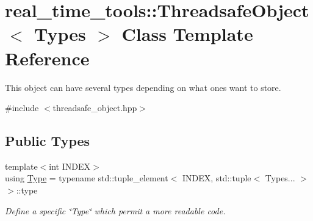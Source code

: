 \hypertarget{classreal__time__tools_1_1ThreadsafeObject}{}\section{real\+\_\+time\+\_\+tools\+:\+:Threadsafe\+Object$<$ Types $>$ Class Template Reference}
\label{classreal__time__tools_1_1ThreadsafeObject}


This object can have several types depending on what ones want to store.  




{\ttfamily \#include $<$threadsafe\+\_\+object.\+hpp$>$}

\subsection*{Public Types}
\begin{DoxyCompactItemize}
\item 
{\footnotesize template$<$int I\+N\+D\+EX$>$ }\\using \hyperlink{classreal__time__tools_1_1ThreadsafeObject_aa40f755aebba0692a345e2b807d781ed}{Type} = typename std\+::tuple\+\_\+element$<$ I\+N\+D\+EX, std\+::tuple$<$ Types... $>$$>$\+::type
\begin{DoxyCompactList}\small\item\em Define a specific \char`\"{}\+Type\char`\"{} which permit a more readable code. \end{DoxyCompactList}\end{DoxyCompactItemize}
